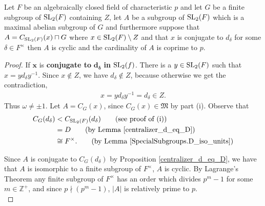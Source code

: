 \begin{theorem}
  \label{MaximalAbelianSubgroup.IsCyclic_and_card_coprime_CharP_of_IsConj_d}
  
  \leanok
  Let $F$ be an algebraically closed field of characteristic $p$ and let $G$ be a finite subgroup of $\operatorname{SL}_2(F)$ containing $Z$, let $A$ be a subgroup of $\operatorname{SL}_2(F)$ which is a maximal abelian subgroup of $G$ and furthermore suppose 
  that $A = C_{\operatorname{SL}_2(F)}(x) \sqcap G$ where $x \in \operatorname{SL}_2(F) \setminus Z$ and that $x$ is conjugate to $d_\delta$ for some $\delta \in F^\times$ then $A$ is cyclic and the cardinality of $A$ is coprime to $p$.
\end{theorem}
\begin{proof}
  \leanok
  If $\pmb{x}$ is \textbf{conjugate to} $\pmb{d_\delta}$ \textbf{in} $\operatorname{SL}_2(f)$. 
  There is a $y \in \operatorname{SL}_2(F)$ such that $x = y d_\delta y^{-1}$. Since $x \not \in Z$, we have $d_\delta \not \in Z$, because otherwise we get the contradiction,
  \begin{align*} x =  y d_\delta y^{-1} = d_\delta \in Z.
  \end{align*}
  Thus $\omega \neq \pm 1$. Let $A = C_G(x)$, since $C_G(x) \in \mathfrak{M}$ by part (i). Observe that
  \begin{align*}  C_G(d_\delta) &<  C_{\SL_2(F)}(d_\delta)  \tag{see proof of (i)}
  \\ &= D  \tag{by Lemma \ref{centralizer_d_eq_D}}
  \\ &\cong F^\times.  \tag{by Lemma \ref{SpecialSubgroups.D_iso_units}}
  \end{align*}
  
  Since $A$ is conjugate to $C_G(d_\delta)$ by Proposition \ref{centralizer_d_eq_D}, 
  we have that $A$ is isomorphic to a finite subgroup of $F^\times$, $A$ is cyclic. 
  By Lagrange's Theorem any finite subgroup of $F^\times$ has an order which divides $p^m - 1$ for some 
  $m \in \mathbb{Z}^+$, and since $p \nmid (p^m - 1)$, $|A|$ is relatively prime to $p$. \\
\end{proof}
